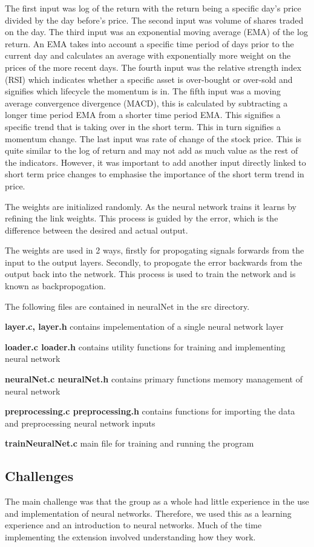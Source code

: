 \documentclass[11pt]{article}
\begin{document}
The first input was log of the return with the return being a specific day's price divided by the day before's price. The second input was volume of shares traded on the day. The third input was an exponential moving average (EMA) of the log return. An EMA takes into account a specific time period of days prior to the current day and calculates an average with exponentially more weight on the prices of the more recent days. The fourth input was the relative strength index (RSI) which indicates whether a specific asset is over-bought or over-sold and signifies which lifecycle the momentum is in. The fifth input was a moving average convergence divergence (MACD), this is calculated by subtracting a longer time period EMA from a shorter time period EMA. This signifies a specific trend that is taking over in the short term. This in turn signifies a momentum change. The last input was rate of change of the stock price. This is quite similar to the log of return and may not add as much value as the rest of the indicators. However, it was important to add another input directly linked to short term price changes to emphasise the importance of the short term trend in price.

The weights are initialized randomly. As the neural network trains it learns by refining the link weights. This process is guided by the error, which is the difference between the desired and actual output. 

The weights are used in 2 ways, firstly for propogating signals forwards from the input to the output layers. Secondly, to propogate the error backwards from the output back into the network. This process is used to train the network and is known as backpropogation. 

The following files are contained in neuralNet in the src directory.


\textbf{layer.c, layer.h} contains impelementation of a single neural network layer 

\textbf{loader.c loader.h} contains utility functions for training and implementing neural network

\textbf{neuralNet.c neuralNet.h} contains primary functions memory management of neural network

\textbf{preprocessing.c preprocessing.h} contains functions for importing the data and preprocessing neural network inputs

\textbf{trainNeuralNet.c} main file for training and running the program

\subsection{Challenges}
The main challenge was that the group as a whole had little experience in the use and implementation of neural networks. 
Therefore, we used this as a learning experience and an introduction to neural networks. 
Much of the time implementing the extension involved understanding how they work.
\end{document}
